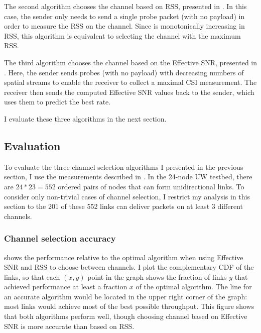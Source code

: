 The second algorithm chooses the channel based on RSS, presented in . In this case, the sender only needs to send a single probe packet (with no payload) in order to measure the RSS on the channel. Since  is monotonically increasing in RSS, this algorithm is equivalent to selecting the channel with the maximum RSS\@.

The third algorithm chooses the channel based on the Effective SNR, presented in . Here, the sender sends probes (with no payload) with decreasing numbers of spatial streams to enable the receiver to collect a maximal CSI measurement. The receiver then sends the computed Effective SNR values back to the sender, which uses them to predict the best rate.

I evaluate these three algorithms in the next section.

\subsection{Evaluation}
To evaluate the three channel selection algorithms I presented in the previous section, I use the measurements described in . In the 24-node UW testbed, there are $24*23=552$ ordered pairs of nodes that can form unidirectional links. To consider only non-trivial cases of channel selection, I restrict my analysis in this section to the 201 of these 552 links can deliver packets on at least 3 different channels.

\subsubsection{Channel selection accuracy}
 shows the performance relative to the optimal algorithm when using Effective SNR and RSS to choose between channels. I plot the complementary CDF of the links, so that each $(x,y)$ point in the graph shows the fraction of links $y$ that achieved performance at least a fraction $x$ of the optimal algorithm. The line for an accurate algorithm would be located in the upper right corner of the graph: most links would achieve most of the best possible throughput. This figure shows that both algorithms perform well, though choosing channel based on Effective SNR is more accurate than based on RSS.

